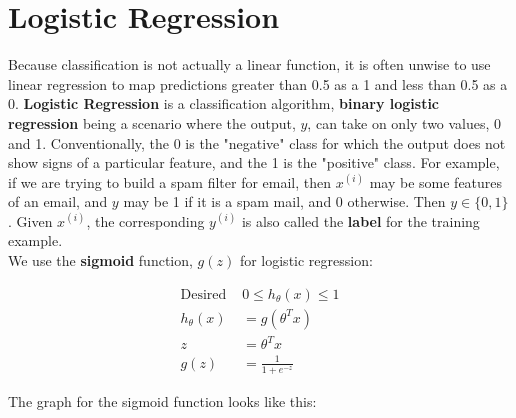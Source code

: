 \documentclass{article}
\begin{document}
    \pagebreak
    \section{Logistic Regression}
        Because classification is not actually a linear function, it is often unwise to use linear regression
        to map predictions greater than 0.5 as a 1 and less than 0.5 as a 0. \textbf{Logistic Regression} is
        a classification algorithm, \textbf{binary logistic regression} being a scenario where the output, $y$,
        can take on only two values, 0 and 1. Conventionally, the 0 is the "negative" class for which the
        output does not show signs of a particular feature, and the 1 is the "positive" class. For example, if
        we are trying to build a spam filter for email, then $x^{(i)}$ may be some features of an email, and
        $y$ may be 1 if it is a spam mail, and 0 otherwise. Then $y\in \{0,1\}$. Given $x^{(i)}$, the
        corresponding $y^{(i)}$ is also called the \textbf{label} for the training example. \\

        \noindent We use the \textbf{sigmoid} function, $g(z)$ for logistic regression:

        \begin{align*}
            \text{Desired } & 0\leq h_{\theta}(x)\leq 1 \\
            h_{\theta}(x)  &= g(\theta^T x) \\
            z              &= \theta^T x \\
            g(z)           &= \frac{1}{1+e^{-z}}
        \end{align*}

        \noindent The graph for the sigmoid function looks like this:

        \begin{center}
        \end{center}
\end{document}
